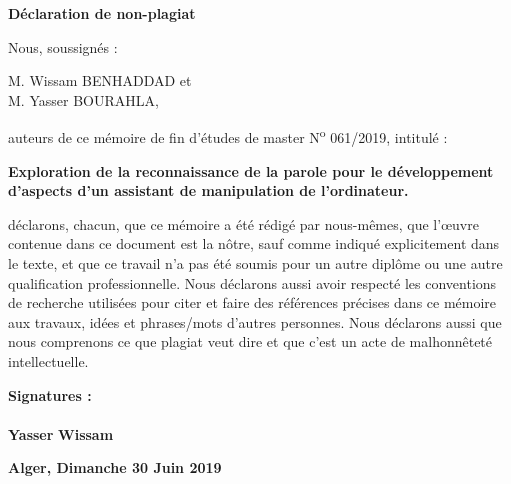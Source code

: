\newpage
\vspace*{1.2cm}
\begin{center}
    \Large
    \textbf{Déclaration de non-plagiat}
\end{center}
\vspace*{2.5cm}
Nous, soussignés :
\vspace*{0.5cm}

M. Wissam BENHADDAD et\\
M. Yasser BOURAHLA,
\vspace*{1cm}

auteurs de ce mémoire de fin d'études de master N\textsuperscript{o} 061/2019, intitulé :
\begin{center}
\large
\textbf{
Exploration de la reconnaissance de la parole pour le développement d'aspects d'un assistant de manipulation de l'ordinateur.
}
\end{center}
\vspace*{1.2cm}


déclarons, chacun, que ce mémoire a été rédigé par nous-mêmes, que l'\oe{}uvre contenue dans ce document est la nôtre, sauf comme indiqué explicitement dans le texte, et que ce travail n'a pas été soumis pour un autre diplôme ou une autre qualification professionnelle. Nous déclarons aussi avoir respecté les conventions de recherche utilisées pour citer et faire des références précises dans ce mémoire aux travaux, idées et phrases/mots d'autres personnes. Nous déclarons aussi que nous comprenons ce que plagiat veut dire et que c'est un acte de malhonnêteté intellectuelle. 



\vspace*{1cm}
\textbf{Signatures :}\\\\
\hspace*{3cm}
\textbf{Yasser}
\hspace*{6cm}
\textbf{Wissam}


\vspace*{3cm}
\hspace*{9cm}
\textbf{Alger, Dimanche 30 Juin 2019}